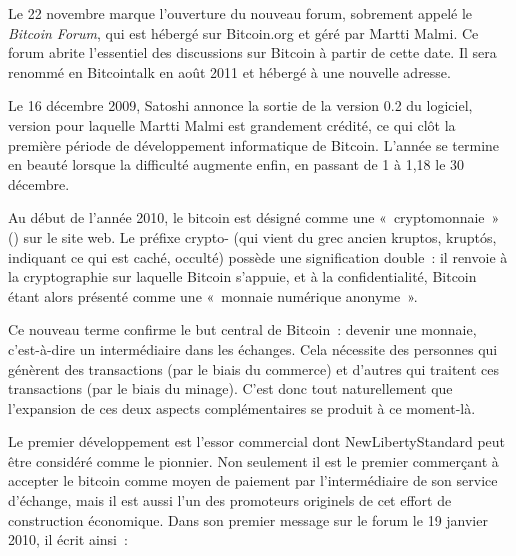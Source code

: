 Le 22 novembre marque l'ouverture du nouveau forum, sobrement appelé le \emph{Bitcoin Forum}, qui est hébergé sur Bitcoin.org et géré par Martti Malmi. Ce forum abrite l'essentiel des discussions sur Bitcoin à partir de cette date. Il sera renommé en Bitcointalk en août 2011 et hébergé à une nouvelle adresse.

Le 16 décembre 2009, Satoshi annonce la sortie de la version 0.2 du logiciel, version pour laquelle Martti Malmi est grandement crédité, ce qui clôt la première période de développement informatique de Bitcoin. L'année se termine en beauté lorsque la difficulté augmente enfin, en passant de 1 à 1,18 le 30 décembre.

Au début de l'année 2010, le bitcoin est désigné comme une «~cryptomonnaie~» () sur le site web. Le préfixe crypto- (qui vient du grec ancien \foreignlanguage{greek}{kruptos}, kruptós, indiquant ce qui est caché, occulté) possède une signification double~: il renvoie à la cryptographie sur laquelle Bitcoin s'appuie, et à la confidentialité, Bitcoin étant alors présenté comme une «~monnaie numérique anonyme~».

Ce nouveau terme confirme le but central de Bitcoin~: devenir une monnaie, c'est-à-dire un intermédiaire dans les échanges. Cela nécessite des personnes qui génèrent des transactions (par le biais du commerce) et d'autres qui traitent ces transactions (par le biais du minage). C'est donc tout naturellement que l'expansion de ces deux aspects complémentaires se produit à ce moment-là.



Le premier développement est l'essor commercial dont NewLibertyStandard peut être considéré comme le pionnier. Non seulement il est le premier commerçant à accepter le bitcoin comme moyen de paiement par l'intermédiaire de son service d'échange, mais il est aussi l'un des promoteurs originels de cet effort de construction économique. Dans son premier message sur le forum le 19 janvier 2010, il écrit ainsi~:

